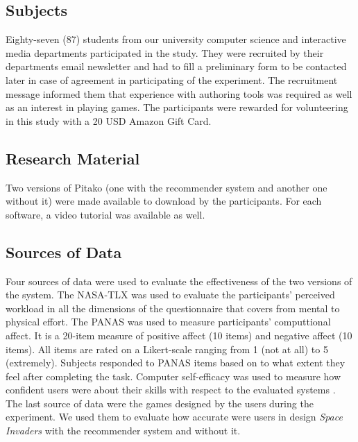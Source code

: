 \documentclass[letterpaper]{article} %
\begin{document}
\subsection{Subjects}
Eighty-seven (87) students from our university computer science and interactive media departments participated in the study. They were recruited by their departments email newsletter and had to fill a preliminary form to be contacted later in case of agreement in participating of the experiment. The recruitment message informed them that experience with authoring tools was required as well as an interest in playing games. The participants were rewarded for volunteering in this study with a 20 USD Amazon Gift Card.

\subsection{Research Material}
Two versions of Pitako (one with the recommender system and another one without it) were made available to download by the participants. For each software, a video tutorial was available as well.

\subsection{Sources of Data}
Four sources of data were used to evaluate the effectiveness of the two versions of the system. The NASA-TLX \cite{hart1988development} was used to evaluate the participants' perceived workload in all the dimensions of the questionnaire that covers from mental to physical effort. The PANAS \cite{crawford2004positive} was used to measure participants' computtional affect. It is a 20-item measure of positive affect (10 items) and negative affect (10 items). All items are rated on a Likert-scale ranging from 1 (not at all) to 5 (extremely). Subjects responded to PANAS items based on to what extent they feel after completing the task. Computer self-efficacy was used to measure how confident users were about their skills with respect to the evaluated systems \cite{marakas1998multilevel}. The last source of data were the games designed by the users during the experiment. We used them to evaluate how accurate were users in design \textit{Space Invaders} with the recommender system and without it.
\end{document}
